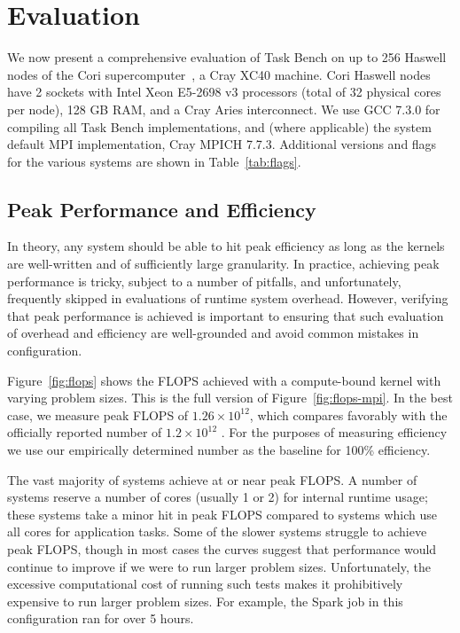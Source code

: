 \section{Evaluation}
\label{sec:evaluation}



We now present a comprehensive evaluation of Task Bench on up to 256
Haswell nodes of the Cori supercomputer~\cite{Cori}, a Cray XC40
machine. Cori Haswell nodes have 2 sockets with Intel Xeon E5-2698 v3
processors (total of 32 physical cores per node), 128 GB RAM, and a
Cray Aries interconnect. We use GCC 7.3.0 for compiling all Task Bench
implementations, and (where applicable) the system default MPI
implementation, Cray MPICH 7.7.3. Additional versions and flags for the
various systems are shown in Table~\ref{tab:flags}.

\subsection{Peak Performance and Efficiency}






In theory, any system should be able to hit peak efficiency as long as
the kernels are well-written and of sufficiently large granularity. In
practice, achieving peak performance is tricky, subject to a number of
pitfalls, and unfortunately, frequently skipped in evaluations of
runtime system overhead. However, verifying that peak performance is
achieved is important to ensuring that such evaluation of overhead and
efficiency are well-grounded and avoid common mistakes in
configuration.

Figure~\ref{fig:flops} shows the FLOPS achieved with a compute-bound
kernel with varying problem sizes. This is the full version of
Figure~\ref{fig:flops-mpi}. In the best case, we measure peak FLOPS of
$1.26 \times 10^{12}$, which compares favorably with the officially
reported number of $1.2 \times 10^{12}$ \cite{Cori}. For the purposes
of measuring efficiency we use our empirically determined number as
the baseline for 100\% efficiency.

The vast majority of systems achieve at or near peak FLOPS. A number
of systems reserve a number of cores (usually 1 or 2) for internal
runtime usage; these systems take a minor hit in peak FLOPS compared
to systems which use all cores for application tasks. Some of the
slower systems struggle to achieve peak FLOPS, though in most cases
the curves suggest that performance would continue to improve if we
were to run larger problem sizes. Unfortunately, the excessive
computational cost of running such tests makes it prohibitively
expensive to run larger problem sizes. For example, the Spark job in
this configuration ran for over 5 hours.

